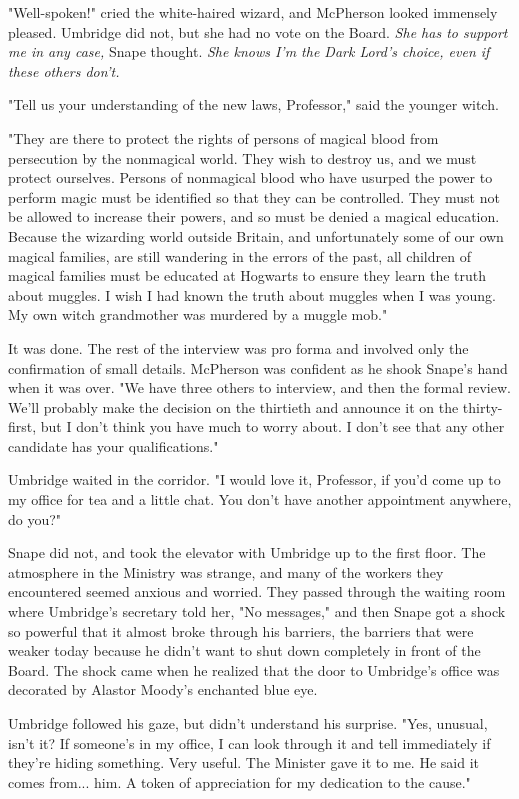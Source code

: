 "Well-spoken!" cried the white-haired wizard, and McPherson looked immensely pleased. Umbridge did not, but she had no vote on the Board. \emph{She has to support me in any case,} Snape thought. \emph{She knows I'm the Dark Lord's choice, even if these others don't.}

"Tell us your understanding of the new laws, Professor," said the younger witch.

"They are there to protect the rights of persons of magical blood from persecution by the nonmagical world. They wish to destroy us, and we must protect ourselves. Persons of nonmagical blood who have usurped the power to perform magic must be identified so that they can be controlled. They must not be allowed to increase their powers, and so must be denied a magical education. Because the wizarding world outside Britain, and unfortunately some of our own magical families, are still wandering in the errors of the past, all children of magical families must be educated at Hogwarts to ensure they learn the truth about muggles. I wish I had known the truth about muggles when I was young. My own witch grandmother was murdered by a muggle mob."

It was done. The rest of the interview was pro forma and involved only the confirmation of small details. McPherson was confident as he shook Snape's hand when it was over. "We have three others to interview, and then the formal review. We'll probably make the decision on the thirtieth and announce it on the thirty-first, but I don't think you have much to worry about. I don't see that any other candidate has your qualifications."

Umbridge waited in the corridor. "I would love it, Professor, if you'd come up to my office for tea and a little chat. You don't have another appointment anywhere, do you?"

Snape did not, and took the elevator with Umbridge up to the first floor. The atmosphere in the Ministry was strange, and many of the workers they encountered seemed anxious and worried. They passed through the waiting room where Umbridge's secretary told her, "No messages," and then Snape got a shock so powerful that it almost broke through his barriers, the barriers that were weaker today because he didn't want to shut down completely in front of the Board. The shock came when he realized that the door to Umbridge's office was decorated by Alastor Moody's enchanted blue eye.

Umbridge followed his gaze, but didn't understand his surprise. "Yes, unusual, isn't it? If someone's in my office, I can look through it and tell immediately if they're hiding something. Very useful. The Minister gave it to me. He said it comes from... him. A token of appreciation for my dedication to the cause."

